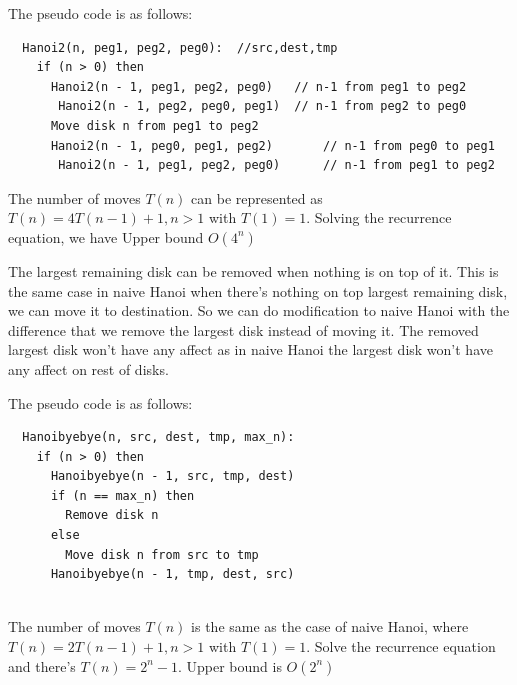 \documentclass[12pt,a4paper]{article}
\newcommand{\question}[1]{\bigskip\noindent{\textbf{Q{#1} solution}}}
\begin{document}
The pseudo code is as follows:

\begin{lstlisting}
  Hanoi2(n, peg1, peg2, peg0):  //src,dest,tmp
    if (n > 0) then
      Hanoi2(n - 1, peg1, peg2, peg0)  	// n-1 from peg1 to peg2
	   Hanoi2(n - 1, peg2, peg0, peg1)	// n-1 from peg2 to peg0
      Move disk n from peg1 to peg2
      Hanoi2(n - 1, peg0, peg1, peg2)		// n-1 from peg0 to peg1
	   Hanoi2(n - 1, peg1, peg2, peg0)		// n-1 from peg1 to peg2
\end{lstlisting}

The number of moves $T(n)$ can be represented as $T(n) = 4T(n - 1) + 1, n > 1$ with $T(1) = 1$. Solving the recurrence equation, we have Upper bound $O(4^n)$


\question{13.C}

The largest remaining disk can be removed when nothing is on top of it. This is the same case in naive Hanoi when there's nothing on top largest remaining disk, we can move it to destination. So we can do modification to naive Hanoi with the difference that we remove the largest disk instead of moving it. The removed largest disk won't have any affect as in naive Hanoi the largest disk won't have any affect on rest of disks.

The pseudo code is as follows:
\begin{lstlisting}
  Hanoibyebye(n, src, dest, tmp, max_n):
    if (n > 0) then
      Hanoibyebye(n - 1, src, tmp, dest)
      if (n == max_n) then
        Remove disk n
      else
        Move disk n from src to tmp
      Hanoibyebye(n - 1, tmp, dest, src)
  
\end{lstlisting}

The number of moves $T(n)$ is the same as the case of naive Hanoi, where $T(n) = 2T(n - 1) + 1, n > 1$ with $T(1) = 1$. Solve the recurrence equation and there's $T(n) = 2^n - 1$. Upper bound is $O(2^n)$
\end{document}

